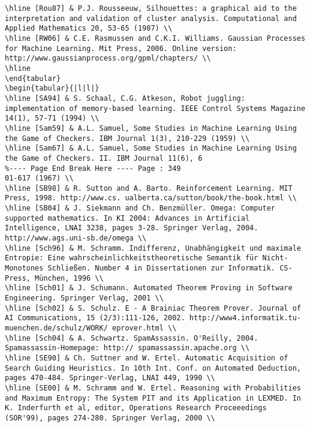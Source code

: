 \documentclass[10pt]{article}
\begin{document}
\begin{verbatim}
\hline [Rou87] & P.J. Rousseeuw, Silhouettes: a graphical aid to the interpretation and validation of cluster analysis. Computational and Applied Mathematics 20, 53-65 (1987) \\
\hline [RW06] & C.E. Rasmussen and C.K.I. Williams. Gaussian Processes for Machine Learning. Mit Press, 2006. Online version: http://www.gaussianprocess.org/gpml/chapters/ \\
\hline
\end{tabular}
\begin{tabular}{|l|l|}
\hline [SA94] & S. Schaal, C.G. Atkeson, Robot juggling: implementation of memory-based learning. IEEE Control Systems Magazine 14(1), 57-71 (1994) \\
\hline [Sam59] & A.L. Samuel, Some Studies in Machine Learning Using the Game of Checkers. IBM Journal 1(3), 210-229 (1959) \\
\hline [Sam67] & A.L. Samuel, Some Studies in Machine Learning Using the Game of Checkers. II. IBM Journal 11(6), 6
%---- Page End Break Here ---- Page : 349
01-617 (1967) \\
\hline [SB98] & R. Sutton and A. Barto. Reinforcement Learning. MIT Press, 1998. http://www.cs. ualberta.ca/sutton/book/the-book.html \\
\hline [SB04] & J. Siekmann and Ch. Benzmüller. Omega: Computer supported mathematics. In KI 2004: Advances in Artificial Intelligence, LNAI 3238, pages 3-28. Springer Verlag, 2004. http://www.ags.uni-sb.de/omega \\
\hline [Sch96] & M. Schramm. Indifferenz, Unabhängigkeit und maximale Entropie: Eine wahrscheinlichkeitstheoretische Semantik für Nicht-Monotones Schließen. Number 4 in Dissertationen zur Informatik. CS-Press, München, 1996 \\
\hline [Sch01] & J. Schumann. Automated Theorem Proving in Software Engineering. Springer Verlag, 2001 \\
\hline [Sch02] & S. Schulz. E - A Brainiac Theorem Prover. Journal of AI Communications, 15 (2/3):111-126, 2002. http://www4.informatik.tu-muenchen.de/schulz/WORK/ eprover.html \\
\hline [Sch04] & A. Schwartz. SpamAssassin. O'Reilly, 2004. Spamassassin-Homepage: http:// spamassassin.apache.org \\
\hline [SE90] & Ch. Suttner and W. Ertel. Automatic Acquisition of Search Guiding Heuristics. In 10th Int. Conf. on Automated Deduction, pages 470-484. Springer-Verlag, LNAI 449, 1990 \\
\hline [SE00] & M. Schramm and W. Ertel. Reasoning with Probabilities and Maximum Entropy: The System PIT and its Application in LEXMED. In K. Inderfurth et al, editor, Operations Research Proceeedings (SOR'99), pages 274-280. Springer Verlag, 2000 \\

\end{verbatim}
\end{document}
